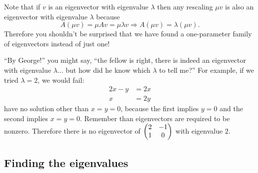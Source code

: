 \documentclass{article}
\begin{document}
\begin{Remark}
Note that if \(v\) is an eigenvector with eigenvalue \(\lambda\)
then any rescaling \(\mu v\) is also an eigenvector with eigenvalue
\(\lambda\) because \[A(\mu v)=\mu Av=\mu\lambda v\Rightarrow A(\mu
v)=\lambda(\mu v).\] Therefore you shouldn't be surprised that we
have found a one-parameter family of eigenvectors instead of just
one!


\end{Remark}
``By George!'' you might say, ``the fellow is right, there is indeed
an eigenvector with eigenvalue \(\lambda\)... but how did he know
which \(\lambda\) to tell me?'' For example, if we tried
\(\lambda=2\), we would fail:
\begin{align*}
2x-y&=2x\\
x&=2y
\end{align*}
have no solution other than \(x=y=0\), because the first implies
\(y=0\) and the second implies \(x=y=0\). Remember than eigenvectors
are required to be nonzero. Therefore there is no eigenvector of \(\begin{pmatrix}
2 & -1 \\ 1 & 0\end{pmatrix}\) with eigenvalue \(2\).


\subsection{Finding the eigenvalues}
\end{document}
